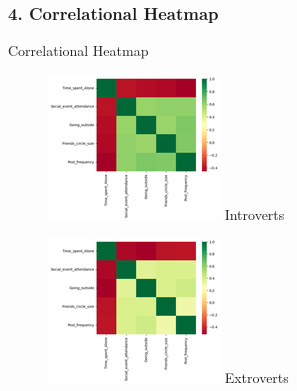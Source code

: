 \documentclass[
]{article}
\begin{document}
\hypertarget{correlational-heatmap}{%
\subsubsection{4. Correlational Heatmap}\label{correlational-heatmap}}

Correlational Heatmap

\begin{figure}[htbp]
    \centering
    \begin{minipage}[t]{0.48\textwidth}
        \centering
        \includegraphics[width=\textwidth]{3_4_1.png}
        Introverts
    \end{minipage}
    \hfill
    \begin{minipage}[t]{0.48\textwidth}
        \centering
        \includegraphics[width=\textwidth]{3_4_2.png}
        Extroverts
    \end{minipage}
\end{figure}
\end{document}
